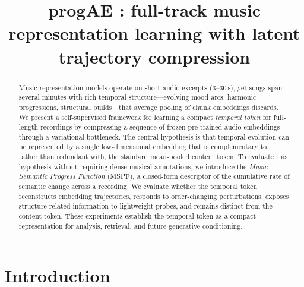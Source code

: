 \documentclass{article}
\begin{document}
\title{progAE : full-track music representation learning with latent trajectory compression}

\address{Anonymous Affiliations\\
\texttt{anonymous@anon.org}}

\maketitle

\ninept


\begin{abstract}
  Music representation models operate on short audio excerpts
  (3--30\,s), yet songs span several minutes with rich temporal
  structure---evolving mood arcs, harmonic progressions, structural
  builds---that average pooling of chunk embeddings discards.  We
  present a self-supervised framework for learning a compact
  \emph{temporal token} for full-length recordings by compressing a
  sequence of frozen pre-trained audio embeddings through a
  variational bottleneck.  The central hypothesis is that temporal
  evolution can be represented by a single low-dimensional embedding
  that is complementary to, rather than redundant with, the standard
  mean-pooled content token.  To evaluate this hypothesis without
  requiring dense musical annotations, we introduce the \emph{Music
  Semantic Progress Function} (MSPF), a closed-form descriptor of the
  cumulative rate of semantic change across a recording.  We evaluate
  whether the temporal token reconstructs embedding trajectories,
  responds to order-changing perturbations, exposes structure-related
  information to lightweight probes, and remains distinct from the
  content token.  These experiments establish the temporal token as a
  compact representation for analysis, retrieval, and future
  generative conditioning.
\end{abstract}

\section{Introduction}
\label{sec:intro}
\end{document}
